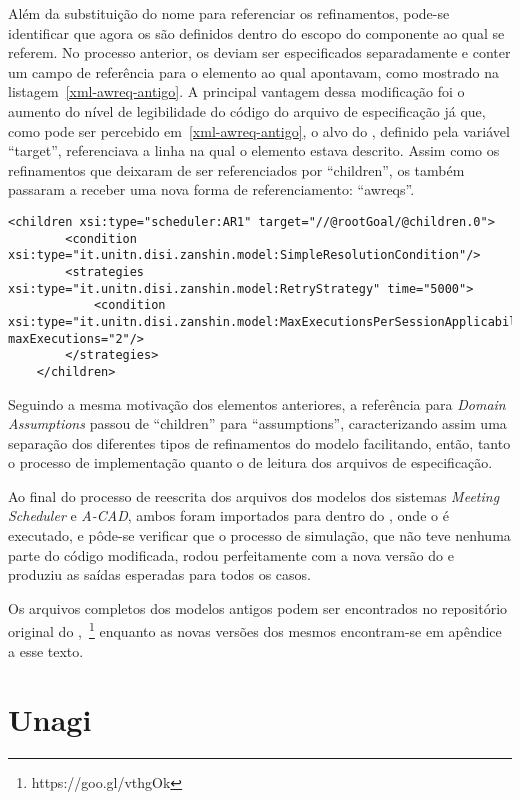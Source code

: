Além da substituição do nome para referenciar os refinamentos, pode-se identificar que agora os \awreqs são definidos dentro do escopo do componente ao qual se referem. No processo anterior, os \awreqs deviam ser especificados separadamente e conter um campo de referência para o elemento ao qual apontavam, como mostrado na listagem~\ref{xml-awreq-antigo}. A principal vantagem dessa modificação foi o aumento do nível de legibilidade do código do arquivo de especificação já que, como pode ser percebido em~\ref{xml-awreq-antigo}, o alvo do \awreq, definido pela variável ``target'', referenciava a linha na qual o elemento estava descrito. Assim como os refinamentos que deixaram de ser referenciados por ``children'', os \awreqs também passaram a receber uma nova forma de referenciamento: ``awreqs''.
 
\begin{lstlisting}[caption={Trecho de XML representando o ACAD no metamodelo original},label={xml-awreq-antigo}]
	<children xsi:type="scheduler:AR1" target="//@rootGoal/@children.0">
		<condition xsi:type="it.unitn.disi.zanshin.model:SimpleResolutionCondition"/>
		<strategies xsi:type="it.unitn.disi.zanshin.model:RetryStrategy" time="5000">
			<condition xsi:type="it.unitn.disi.zanshin.model:MaxExecutionsPerSessionApplicabilityCondition" maxExecutions="2"/>
		</strategies>
	</children>
\end{lstlisting}

Seguindo a mesma motivação dos elementos anteriores, a referência para \textit{Domain Assumptions} passou de ``children'' para ``assumptions'', caracterizando assim uma separação dos diferentes tipos de refinamentos do modelo facilitando, então, tanto o processo de implementação quanto o de leitura dos arquivos de especificação. 

Ao final do processo de reescrita dos arquivos dos modelos dos sistemas \textit{Meeting Scheduler} e \textit{A-CAD}, ambos foram importados para dentro do \eclipse, onde o \zanshin é executado, e pôde-se verificar que o processo de simulação, que não teve nenhuma parte do código modificada, rodou perfeitamente com a nova versão do \zanshin e produziu as saídas esperadas para todos os casos.

Os arquivos completos dos modelos antigos podem ser encontrados no repositório original do \framework,~\footnote{https://goo.gl/vthgOk} enquanto as novas versões dos mesmos encontram-se em apêndice a esse texto.

\section{Unagi}

